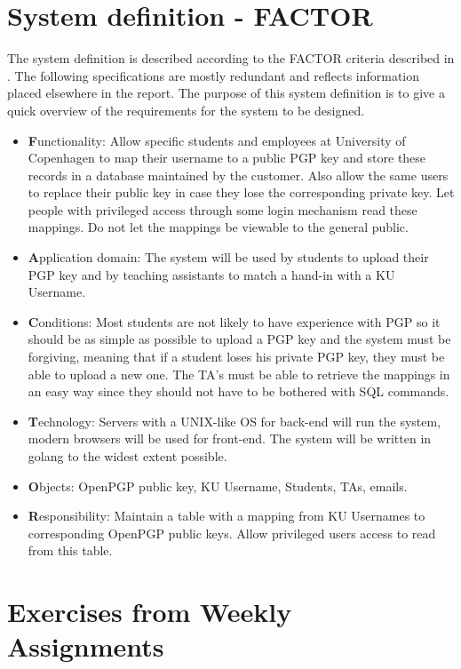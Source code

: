 \documentclass[11pt,a4paper]{report}
\begin{document}
\section{System definition - FACTOR}
The system definition is described according to the FACTOR criteria described in \cite{matthiassen}. The following specifications are mostly redundant and reflects information placed elsewhere in the report. The purpose of this system definition is to give a quick overview of the requirements for the system to be designed.
\begin{itemize}
\item \textbf{F}unctionality: Allow specific students and employees at University of Copenhagen to map their username to a public PGP key and store these records in a database maintained by the customer. Also allow the same users to replace their public key in case they lose the corresponding private key. Let people with privileged access through some login mechanism read these mappings. Do not let the mappings be viewable to the general public.
\item \textbf{A}pplication domain: The system will be used by students to upload their PGP key and by teaching assistants to match a hand-in with a KU Username.
\item \textbf{C}onditions: Most students are not likely to have experience with PGP so it should be as simple as possible to upload a PGP key and the system must be forgiving, meaning that if a student loses his private PGP key, they must be able to upload a new one. The TA's must be able to retrieve the mappings in an easy way since they should not have to be bothered with SQL commands.
\item \textbf{T}echnology: Servers with a UNIX-like OS for back-end will run the system, modern browsers will be used for front-end. The system will be written in golang to the widest extent possible.
\item \textbf{O}bjects: OpenPGP public key, KU Username, Students, TAs, emails.
\item \textbf{R}esponsibility: Maintain a table with a mapping from KU Usernames to corresponding OpenPGP public keys. Allow privileged users access to read from this table.
\end{itemize}

\newpage
\section{Exercises from Weekly Assignments}
\end{document}
